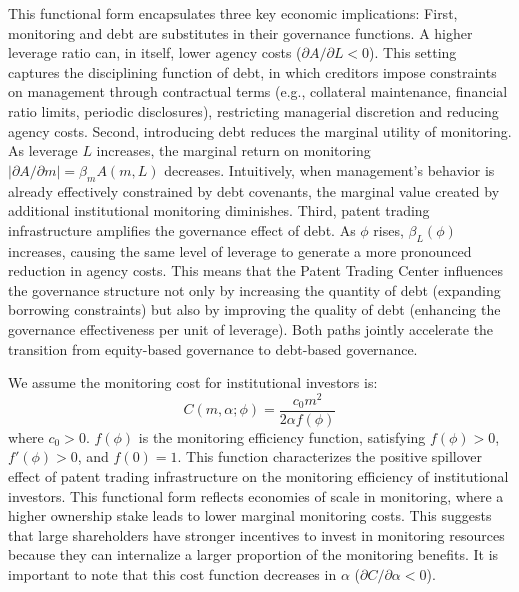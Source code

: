 \documentclass[12pt,a4paper]{article}
\begin{document}
This functional form encapsulates three key economic implications: First, monitoring and debt are substitutes in their governance functions. A higher leverage ratio can, in itself, lower agency costs ($\partial A / \partial L < 0$). This setting captures the disciplining function of debt, in which creditors impose constraints on management through contractual terms (e.g., collateral maintenance, financial ratio limits, periodic disclosures), restricting managerial discretion and reducing agency costs. Second, introducing debt reduces the marginal utility of monitoring. As leverage $L$ increases, the marginal return on monitoring $|\partial A / \partial m| = \beta_m A(m, L)$ decreases. Intuitively, when management's behavior is already effectively constrained by debt covenants, the marginal value created by additional institutional monitoring diminishes. Third, patent trading infrastructure amplifies the governance effect of debt. As $\phi$ rises, $\beta_L(\phi)$ increases, causing the same level of leverage to generate a more pronounced reduction in agency costs. This means that the Patent Trading Center influences the governance structure not only by increasing the quantity of debt (expanding borrowing constraints) but also by improving the quality of debt (enhancing the governance effectiveness per unit of leverage). Both paths jointly accelerate the transition from equity-based governance to debt-based governance.

We assume the monitoring cost for institutional investors is:
\begin{equation}
C(m, \alpha; \phi) = \frac{c_0 m^2}{2 \alpha f(\phi)}
\end{equation}
where $c_0 > 0$. $f(\phi)$ is the monitoring efficiency function, satisfying $f(\phi) > 0$, $f'(\phi) > 0$, and $f(0) = 1$. This function characterizes the positive spillover effect of patent trading infrastructure on the monitoring efficiency of institutional investors. This functional form reflects economies of scale in monitoring, where a higher ownership stake leads to lower marginal monitoring costs. This suggests that large shareholders have stronger incentives to invest in monitoring resources because they can internalize a larger proportion of the monitoring benefits. It is important to note that this cost function decreases in $\alpha$ ($\partial C / \partial \alpha < 0$). 
\end{document}
